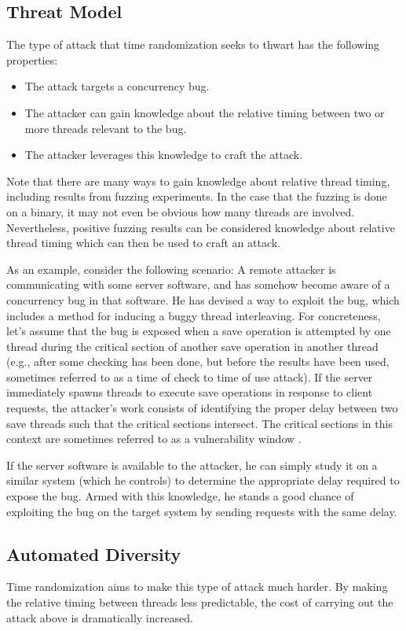 \subsection{Threat Model}
The type of attack that time randomization seeks to thwart has the following properties:
\begin{itemize}
	\item The attack targets a concurrency bug.
	\item The attacker can gain knowledge about the relative timing between two
  or more threads relevant to the bug.
	\item The attacker leverages this knowledge to craft the attack.
\end{itemize}
Note that there are many ways to gain knowledge about relative thread timing, including results from fuzzing experiments.
In the case that the fuzzing is done on a binary, it may not even be obvious how many threads are involved.
Nevertheless, positive fuzzing results can be considered knowledge about relative thread timing which can then be used to craft an attack.

As an example, consider the following scenario:
A remote attacker is communicating with some server software, and has somehow become aware of a concurrency bug in that software.
He has devised a way to exploit the bug, which includes a method for inducing a buggy thread interleaving.
For concreteness, let's assume that the bug is exposed when a save operation
is attempted by one thread during the critical section of another save
operation in another thread (e.g., after some checking has been done, but before the results have been used, sometimes referred to as a time of check to time of use attack).
If the server immediately spawns threads to execute save operations in response to client requests, the attacker's work consists of identifying the proper delay between two save threads such that the critical sections intersect.
The critical sections in this context are sometimes referred to as a vulnerability window \cite{Yang2012}.

If the server software is available to the attacker, he can simply study it on a similar system (which he controls) to determine the appropriate delay required to expose the bug.
Armed with this knowledge, he stands a good chance of exploiting the bug on the target system by sending requests with the same delay.
\subsection{Automated Diversity}\label{automated-diversity}
Time randomization aims to make this type of attack much harder.
By making the relative timing between threads less predictable, the cost of carrying out the attack above is dramatically increased.

